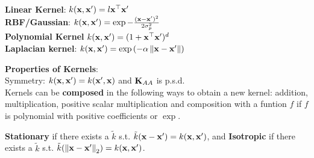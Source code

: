 \begin{framed}
    \textbf{Linear Kernel}: $k(\mathbf{x}, \mathbf{x'}) = l \mathbf{x}^\top \mathbf{x'}$ \\
    \textbf{RBF/Gaussian}: $k(\mathbf{x}, \mathbf{x'}) = \exp{-\frac{(\mathbf{x}- \mathbf{x'})^2}{2\sigma_p^2}}$ \\
    \textbf{Polynomial Kernel} $k(\mathbf{x}, \mathbf{x'}) = (1 + \mathbf{x}^\top \mathbf{x'})^d$ \\
    \textbf{Laplacian kernel}: $k(\vx, \vxp) = \exp{\left(-\alpha \norm{\vx - \vxp}\right)}$
\end{framed}
\begin{framed}
    \textbf{Properties of Kernels}:  \\
    Symmetry: $k(\mathbf{x}, \mathbf{x'}) = k(\mathbf{x'}, \mathbf{x})$ and $\mathbf{K}_{AA}$ is p.s.d. \\
    Kernels can be \textbf{composed} in the following ways to obtain a new kernel: addition, multiplication, positive scalar multiplication and composition with a funtion $f$ if $f$ is polynomial with positive coefficients or $\exp$.
\end{framed}
\textbf{Stationary} if there exists a $\tilde{k}$ s.t. $\tilde{k}(\mathbf{x} - \mathbf{x'}) = k(\mathbf{x}, \mathbf{x'})$, and \textbf{Isotropic} if there exists a $\tilde{k}$ s.t. $\tilde{k}(\norm{\vx-\vxp}_2) = k(\vx, \vxp)$.

